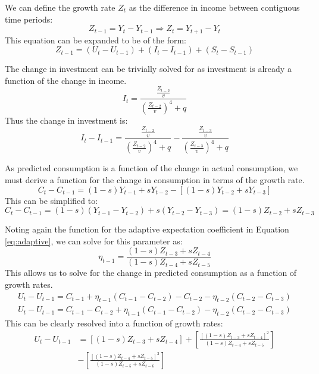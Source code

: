 We can define the growth rate $Z_t$ as the difference in income between contiguous time periods:
\begin{equation}
    Z_{t-1}=Y_t-Y_{t-1}\Rightarrow Z_t=Y_{t+1}-Y_t
\end{equation}
This equation can be expanded to be of the form:
\begin{equation*}
    Z_{t-1}=(U_t-U_{t-1})+(I_t-I_{t-1})+(S_t-S_{t-1})
\end{equation*}

The change in investment can be trivially solved for as investment is already a function of the change in income.
\begin{equation*}
    I_t=\frac{\frac{Z_{t-2}}{v}}{\left(\frac{Z_{t-2}}{v}\right)^4+q}
\end{equation*}
Thus the change in investment is:
\begin{equation}
    I_t-I_{t-1}=\frac{\frac{Z_{t-2}}{v}}{\left(\frac{Z_{t-2}}{v}\right)^4+q}-\frac{\frac{Z_{t-3}}{v}}{\left(\frac{Z_{t-3}}{v}\right)^4+q}
\end{equation}

As predicted consumption is a function of the change in actual consumption, we must derive a function for the change in consumption in terms of the growth rate.
\begin{equation*}
    C_t-C_{t-1}=(1-s)Y_{t-1}+sY_{t-2}-[(1-s)Y_{t-2}+sY_{t-3}]
\end{equation*}
This can be simplified to:
\begin{equation}
    C_t-C_{t-1}=(1-s)(Y_{t-1}-Y_{t-2})+s(Y_{t-2}-Y_{t-3})=(1-s)Z_{t-2}+sZ_{t-3}
\end{equation}

Noting again the function for the adaptive expectation coefficient in Equation \ref{eq:adaptive}, we can solve for this parameter as:
\begin{equation}
    \eta_{t-1}=\frac{(1-s)Z_{t-3}+sZ_{t-4}}{(1-s)Z_{t-4}+sZ_{t-5}}
\end{equation}
This allows us to solve for the change in predicted consumption as a function of growth rates. 
\begin{gather*}
    U_t-U_{t-1}=C_{t-1}+\eta_{t-1}(C_{t-1}-C_{t-2})-C_{t-2}-\eta_{t-2}(C_{t-2}-C_{t-3})\\
    U_t-U_{t-1}=C_{t-1}-C_{t-2}+\eta_{t-1}(C_{t-1}-C_{t-2})-\eta_{t-2}(C_{t-2}-C_{t-3})
\end{gather*}
This can be clearly resolved into a function of growth rates:
\begin{equation}
\begin{split}
    U_t-U_{t-1}& =[(1-s)Z_{t-3}+sZ_{t-4}]+\left[\frac{[(1-s)Z_{t-3}+sZ_{t-4}]^2}{(1-s)Z_{t-4}+sZ_{t-5}}\right]\\
    & -\left[\frac{[(1-s)Z_{t-4}+sZ_{t-5}]^2}{(1-s)Z_{t-5}+sZ_{t-6}}\right]
\end{split}
\end{equation}


